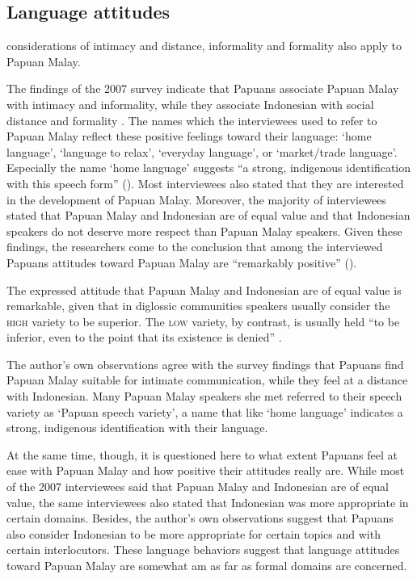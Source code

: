 \subsection{Language attitudes}\label{Para_1.5.2}
 considerations of intimacy and distance, informality and formality also apply to Papuan Malay.


The findings of the 2007 survey indicate that Papuans associate Papuan Malay with intimacy and informality, while they associate Indonesian with social distance and formality \citep{Scott.2008}. The names which the interviewees used to refer to Papuan Malay reflect these positive feelings toward their language:  ‘home language’,  ‘language to relax’,  ‘everyday language’, or  ‘market/trade language’. Especially the name  ‘home language’ suggests  ``a strong, indigenous identification with this speech form'' (\citeyear*[18]{Scott.2008}). Most interviewees also stated that they are interested in the development of Papuan Malay. Moreover, the majority of interviewees stated that Papuan Malay and Indonesian are of equal value and that Indonesian speakers do not deserve more respect than Papuan Malay speakers. Given these findings, the researchers come to the conclusion that among the interviewed Papuans attitudes toward Papuan Malay are  ``remarkably positive'' (\citeyear*[18–22]{Scott.2008}).


The expressed attitude that Papuan Malay and Indonesian are of equal value is remarkable, given that in diglossic communities speakers usually consider the \textsc{high} variety to be superior. The \textsc{low} variety, by contrast, is usually held  ``to be inferior, even to the point that its existence is denied'' \citep[36]{Fasold.1984}.


The author’s own observations agree with the survey findings that Papuans find Papuan Malay suitable for intimate communication, while they feel at a distance with Indonesian. Many Papuan Malay speakers she met referred to their speech variety as  ‘Papuan speech variety’, a name that like  ‘home language’ indicates a strong, indigenous identification with their language.


At the same time, though, it is questioned here to what extent Papuans feel at ease with Papuan Malay and how positive their attitudes really are. While most of the 2007 interviewees said that Papuan Malay and Indonesian are of equal value, the same interviewees also stated that Indonesian was more appropriate in certain domains. Besides, the author’s own observations suggest that Papuans also consider Indonesian to be more appropriate for certain topics and with certain interlocutors. These language behaviors suggest that language attitudes toward Papuan Malay are somewhat am as far as formal domains are concerned.



